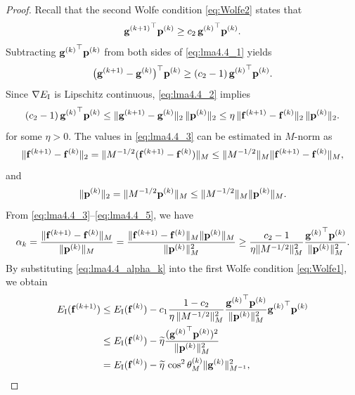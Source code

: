 \documentclass[11pt,a4paper]{article}
\begin{document}
\begin{proof} 
Recall that the second Wolfe condition \eqref{eq:Wolfe2} states that
\begin{equation} \label{eq:lma4.4_1}
{\mathbf{g}^{(k+1)}}^{\top} \mathbf{p}^{(k)} \geq c_2\, {\mathbf{g}^{(k)}}^{\top} \mathbf{p}^{(k)}.
\end{equation}
Subtracting ${\mathbf{g}^{(k)}}^{\top} \mathbf{p}^{(k)}$ from both sides of \eqref{eq:lma4.4_1} yields
\begin{equation} \label{eq:lma4.4_2}
\big({\mathbf{g}^{(k+1)}} - {\mathbf{g}^{(k)}}\big)^{\top} \mathbf{p}^{(k)} \geq (c_2-1) \, {\mathbf{g}^{(k)}}^{\top} \mathbf{p}^{(k)}.
\end{equation}
Since $\nabla E_{\mathrm{I}}$ is Lipschitz continuous, \eqref{eq:lma4.4_2} implies
\begin{equation} \label{eq:lma4.4_3}
(c_2-1) \, {\mathbf{g}^{(k)}}^{\top} \mathbf{p}^{(k)}
\leq \| {\mathbf{g}^{(k+1)}} - {\mathbf{g}^{(k)}} \|_2 \,\|\mathbf{p}^{(k)}\|_2 
\leq \eta \, \| {\mathbf{f}}^{(k+1)} - {\mathbf{f}}^{(k)} \|_2 \,\| \mathbf{p}^{(k)}\|_2.
\end{equation}
for some $\eta > 0$.
The values in \eqref{eq:lma4.4_3} can be estimated in $M$-norm as
\begin{equation} \label{eq:lma4.4_4}
\| {\mathbf{f}}^{(k+1)} - {\mathbf{f}}^{(k)} \|_2
= \| M^{-1/2} ({\mathbf{f}}^{(k+1)} - {\mathbf{f}}^{(k)}) \|_{M}
\leq \|M^{-1/2}\|_{M} \| {\mathbf{f}}^{(k+1)} - {\mathbf{f}}^{(k)} \|_{M},
\end{equation}
and
\begin{equation} \label{eq:lma4.4_5}
\| \mathbf{p}^{(k)}\|_2 = \| M^{-1/2} \mathbf{p}^{(k)}\|_{M}
\leq \|M^{-1/2}\|_{M} \|\mathbf{p}^{(k)}\|_{M}.
\end{equation}
From \eqref{eq:lma4.4_3}--\eqref{eq:lma4.4_5}, we have
\begin{equation} \label{eq:lma4.4_alpha_k}
\alpha_k = \frac{\| {\mathbf{f}}^{(k+1)} - {\mathbf{f}}^{(k)} \|_{M}}{\|\mathbf{p}^{(k)}\|_{M}}
= \frac{\| {\mathbf{f}}^{(k+1)} - {\mathbf{f}}^{(k)} \|_{M} \|\mathbf{p}^{(k)}\|_{M}}{\|\mathbf{p}^{(k)}\|_{M}^2}
\geq \frac{c_2-1}{ \eta \|M^{-1/2}\|^2_{M} } \frac{{\mathbf{g}^{(k)}}^{\top} \mathbf{p}^{(k)}}{\| \mathbf{p}^{(k)}\|^2_{M}}.
\end{equation}
By substituting \eqref{eq:lma4.4_alpha_k} into the first Wolfe condition \eqref{eq:Wolfe1}, we obtain
\begin{align}
E_\mathrm{I}({\f}^{(k+1)}) 
&\leq E_\mathrm{I}(\f^{(k)}) - c_1 \frac{1 -c_2}{ \eta \, \|M^{-1/2}\|^2_{M}} \frac{{\g^{(k)}}^{\top} \p^{(k)}}{\| \p^{(k)}\|^2_{M}} {\g^{(k)}}^\top \p^{(k)} \nonumber\\
&\leq E_\mathrm{I}({\f}^{(k)}) - \widetilde\eta  \frac{({\g^{(k)}}^{\top} \p^{(k)})^2}{\| \p^{(k)}\|^2_{M}} \nonumber\\
&= E_\mathrm{I}({\f}^{(k)}) - \widetilde \eta\, \cos^2\theta_M^{(k)} \|{\g^{(k)}}\|_{M^{-1}}^2, \label{eq:4.12}

\end{align}
\end{proof}
\end{document}
